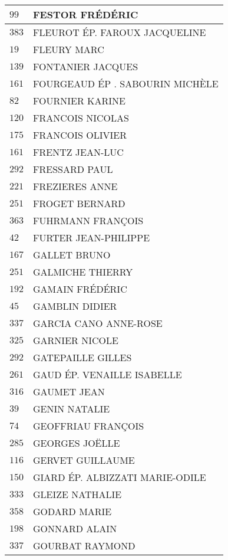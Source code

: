 \begin{xltabular}{\linewidth}{|l|X|}
    $99$ & FESTOR FRÉDÉRIC \\
    \hline
    $383$ & FLEUROT ÉP. FAROUX JACQUELINE \\
    \hline
    $19$ & FLEURY MARC \\
    \hline
    $139$ & FONTANIER JACQUES \\
    \hline
    $161$ & FOURGEAUD ÉP . SABOURIN MICHÈLE \\
    \hline
    $82$ & FOURNIER KARINE \\
    \hline
    $120$ & FRANCOIS NICOLAS \\
    \hline
    $175$ & FRANCOIS OLIVIER \\
    \hline
    $161$ & FRENTZ JEAN-LUC \\
    \hline
    $292$ & FRESSARD PAUL \\
    \hline
    $221$ & FREZIERES ANNE \\
    \hline
    $251$ & FROGET BERNARD \\
    \hline
    $363$ & FUHRMANN FRANÇOIS \\
    \hline
    $42$ & FURTER JEAN-PHILIPPE \\
    \hline
    $167$ & GALLET BRUNO \\
    \hline
    $251$ & GALMICHE THIERRY \\
    \hline
    $192$ & GAMAIN FRÉDÉRIC \\
    \hline
    $45$ & GAMBLIN DIDIER \\
    \hline
    $337$ & GARCIA CANO ANNE-ROSE \\
    \hline
    $325$ & GARNIER NICOLE \\
    \hline
    $292$ & GATEPAILLE GILLES \\
    \hline
    $261$ & GAUD ÉP. VENAILLE ISABELLE \\
    \hline
    $316$ & GAUMET JEAN \\
    \hline
    $39$ & GENIN NATALIE \\
    \hline
    $74$ & GEOFFRIAU FRANÇOIS \\
    \hline
    $285$ & GEORGES JOËLLE \\
    \hline
    $116$ & GERVET GUILLAUME \\
    \hline
    $150$ & GIARD ÉP. ALBIZZATI MARIE-ODILE \\
    \hline
    $333$ & GLEIZE NATHALIE \\
    \hline
    $358$ & GODARD MARIE \\
    \hline
    $198$ & GONNARD ALAIN \\
    \hline
    $337$ & GOURBAT RAYMOND \\

\end{xltabular}
